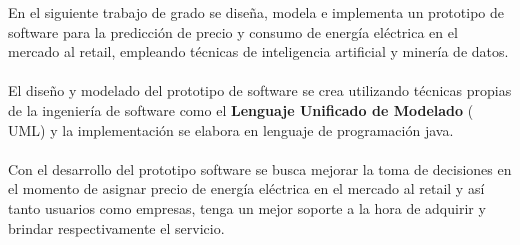 En el siguiente trabajo de grado se diseña, modela e implementa un prototipo de software para la predicción de precio y consumo de energía eléctrica en el mercado al retail, empleando técnicas de inteligencia artificial y minería de datos.
\\\\
El diseño y modelado del prototipo de software se crea utilizando técnicas propias de la ingeniería de software como  el \textbf{Lenguaje Unificado de Modelado} ( UML) y la implementación se elabora en lenguaje de programación java.
\\\\
Con el desarrollo del prototipo software se busca mejorar la toma de decisiones en el momento de asignar precio de energía eléctrica en el mercado al retail y así tanto usuarios como empresas, tenga un mejor soporte a la hora de adquirir y brindar respectivamente el servicio.



  
